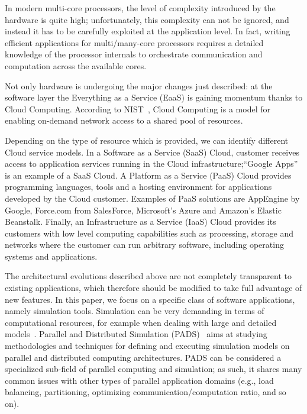 \documentclass[1p]{elsarticle}
\begin{document}
In modern multi-core processors, the level of complexity introduced by
the hardware is quite high; unfortunately, this complexity can not be
ignored, and instead it has to be carefully exploited at the
application level. In fact, writing efficient applications for
multi/many-core processors requires a detailed knowledge of the
processor internals to orchestrate communication and computation
across the available cores. 

Not only hardware is undergoing the major changes just described: at
the software layer the Everything as a Service (EaaS) is gaining 
momentum thanks to Cloud Computing. According to NIST~\cite{mell11}, 
Cloud Computing is a model for enabling on-demand network access to 
a shared pool of resources.

Depending on the type of resource which is provided, we can identify
different Cloud service models. In a Software as a Service (SaaS)
Cloud, customer receives access to application services running in the
Cloud infrastructure;``Google Apps'' is an example of a SaaS Cloud.  A
Platform as a Service (PaaS) Cloud provides programming languages,
tools and a hosting environment for applications developed by the
Cloud customer. Examples of PaaS solutions are AppEngine by Google,
Force.com from SalesForce, Microsoft's Azure and Amazon's Elastic
Beanstalk. Finally, an Infrastructure as a Service (IaaS) Cloud
provides its customers with low level computing capabilities such as
processing, storage and networks where the customer can run arbitrary
software, including operating systems and applications.

The architectural evolutions described above are not completely
transparent to existing applications, which therefore should be modified 
to take full advantage of new features. In
this paper, we focus on a specific class of software applications,
namely simulation tools. Simulation can be very demanding in terms of
computational resources, for example when dealing with large and
detailed models~\cite{FUJ00}. 
Parallel and Distributed Simulation
(PADS)~\cite{FUJ00} aims at studying methodologies
and techniques for defining and executing simulation models on
parallel and distributed computing architectures. PADS can be
considered a specialized sub-field of parallel computing and
simulation; as such, it shares many common issues with other types of
parallel application domains (e.g., load balancing, partitioning,
optimizing communication/computation ratio, and so on). 
\end{document}
